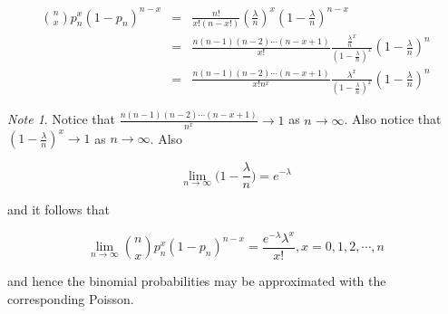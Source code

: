 \documentclass[12pt,a4paper]{article}
\theoremstyle{regla}
\theoremstyle{remark}
\newtheorem{notes}{Note}[section]
\theoremstyle{definition}
\theoremstyle{nonumberbreak}
\begin{document}
\begin{eqnarray}
\binom{n}{x}p_n^x(1-p_n)^{n-x}& = &\frac{n!}{x!(n-x!)} \left ( \frac{\lambda}{n} \right )^x \left ( 1-\frac{\lambda}{n} \right )^{n-x}\\
& = &\frac{n(n-1)(n-2)\cdots (n-x+1)}{x!} \frac{\frac{\lambda}{n}^x}{\left ( 1-\frac{\lambda}{n} \right ) ^x} \left ( 1-\frac{\lambda}{n} \right )^n\\
& = &\frac{n(n-1)(n-2)\cdots (n-x+1)}{x!n^x} \frac{\lambda^x}{\left ( 1-\frac{\lambda}{n} \right ) ^x} \left ( 1-\frac{\lambda}{n} \right )^n
\end{eqnarray}
\begin{notes}
Notice that $\frac{n(n-1)(n-2)\cdots (n-x+1)}{n^x}\to 1$ as $n\to\infty$. Also notice that $(1-\frac{\lambda}{n})^x\to 1$ as $n\to\infty$. Also

$$\lim_{n \to \infty} \bigg( 1-\frac{\lambda}{n} \bigg) = e^{- \lambda}$$

 

and it follows that

$$ \lim_{n \to \infty} \binom{n}{x}p_n^x(1-p_n)^{n-x} = \frac{e^{- \lambda} \lambda^x}{x!}, x= 0,1,2, \cdots , n $$

and hence the binomial probabilities may be approximated with the corresponding Poisson.   
\end{notes}
\end{document}
